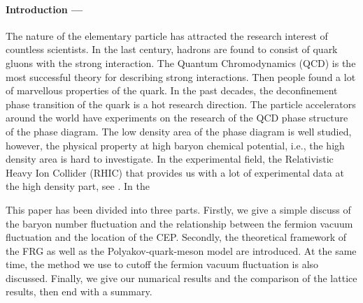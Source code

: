 \documentclass[%
reprint,
superscriptaddress,
showpacs,preprintnumbers,
 amsmath,amssymb,
 aps,
prl,
]{revtex4-1}
\begin{document}
\paragraph*{Introduction ---\!\!\!}
\label{sec:int}
The nature of the elementary particle has attracted the research interest of countless scientists. In the last century, hadrons are found to consist of quark gluons with the strong interaction. The Quantum Chromodynamics (QCD) is the most successful theory for describing strong interactions. Then people found a lot of marvellous properties of the quark. In the past decades, the deconfinement phase transition of the quark is a hot research direction. The particle accelerators around the world have experiments on the research of the QCD phase structure of the phase diagram. The low density area of the phase diagram is well studied, however, the physical property at high baryon chemical potential, i.e., the high density area is hard to investigate. In the experimental field, the Relativistic Heavy Ion Collider (RHIC) that provides us with a lot of experimental data at the high density part, see \cite{Adamczyk:2013dal,Luo:2015ewa,Luo:2017faz}. In the 

\par
This paper has been divided into three parts. Firstly, we give a simple discuss of the baryon number fluctuation and the relationship between the fermion vacuum fluctuation and the location of the CEP. Secondly, the theoretical framework of the FRG as well as the Polyakov-quark-meson model are introduced. At the same time, the method we use to cutoff the fermion vacuum fluctuation is also discussed. Finally, we give our numarical results and the comparison of the lattice results, then end with a summary.

\end{document}
